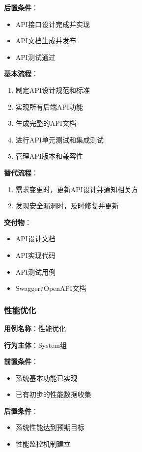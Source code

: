 \documentclass[a4paper,12pt]{article}
\begin{document}
\textbf{后置条件}：
\begin{itemize}
  \item API接口设计完成并实现
  \item API文档生成并发布
  \item API测试通过
\end{itemize}

\textbf{基本流程}：
\begin{enumerate}
  \item 制定API设计规范和标准
  \item 实现所有后端API功能
  \item 生成完整的API文档
  \item 进行API单元测试和集成测试
  \item 管理API版本和兼容性
\end{enumerate}

\textbf{替代流程}：
\begin{enumerate}
  \item 需求变更时，更新API设计并通知相关方
  \item 发现安全漏洞时，及时修复并更新
\end{enumerate}

\textbf{交付物}：
\begin{itemize}
  \item API设计文档
  \item API实现代码
  \item API测试用例
  \item Swagger/OpenAPI文档
\end{itemize}

\subsubsection{性能优化}

\textbf{用例名称}：性能优化

\textbf{行为主体}：System组

\textbf{前置条件}：
\begin{itemize}
  \item 系统基本功能已实现
  \item 已有初步的性能数据收集
\end{itemize}

\textbf{后置条件}：
\begin{itemize}
  \item 系统性能达到预期目标
  \item 性能监控机制建立
\end{itemize}
\end{document}
